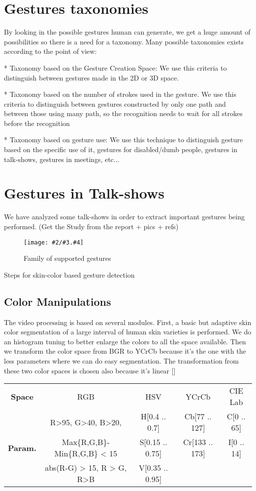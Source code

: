 \documentclass{llncs}
\newcommand{\imagepathext}[5]{%
\begin{figure}[hbtp]
\hfil\texttt{[image: \#2/\#3.\#4]}\hfil
\caption{#5\label{#3}}
\end{figure}}
\newcommand{\png}[2]{\imagepathext{width=\columnwidth}{pics}{#1}{png}{#2}}
\begin{document}
\section{Gestures taxonomies}
By looking in the possible gestures human can generate, we get a huge amount of possibilities so there is a need for a taxonomy. Many possible taxonomies exists according to the point of view:

* Taxonomy based on the Gesture Creation Space:
We use this criteria to distinguish between gestures made in the 2D or 3D space.

* Taxonomy based on the number of strokes used in the gesture.
We use this criteria to distinguish between gestures constructed by only one path and between those using many path, so the recognition needs to wait for all strokes before the recognition

* Taxonomy based on gesture use:
We use this technique to distinguish gesture based on the specific use of it, gestures for disabled/dumb people, gestures in talk-shows, gestures in meetings, etc...

\section{Gestures in Talk-shows}
We have analyzed some talk-shows in order to extract important gestures being performed.
(Get the Study from the report + pics + refs)

\png{handg}{Family of supported gestures}

Steps for skin-color based gesture detection

\subsection{Color Manipulations}
The video processing is based on several modules. First, a basic but adaptive skin color segmentation of a large interval of human skin varieties is performed. 
We do an histogram tuning to better enlarge the colors to all the space available.
Then we transform the color space from BGR to YCrCb because it’s the one with the less parameters where we can do easy segmentation. The transformation from these two color spaces is chosen also because it’s linear []

\begin{center}
\begin{tabular}{c|c|c|c|c}
\textbf{Space} & RGB & HSV & YCrCb & CIE Lab\\
  & R>95, G>40, B>20, & H[0.4 .. 0.7] & Cb[77 .. 127] & C[0 .. 65] \\
\textbf{Param.} & Max\{R,G,B\}-Min\{R,G,B\} < 15 & S[0.15 .. 0.75] & Cr[133 .. 173] & I[0 .. 14] \\
  & abs(R-G) > 15, R > G, R>B & V[0.35 .. 0.95] & &
\end{tabular}
\end{center}
\end{document}
